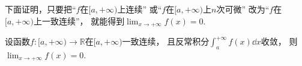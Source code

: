 下面证明，只要把“\(f\)在\([a,+\infty)\)上连续”
或“\(f\)在\([a,+\infty)\)上\(n\)次可微”
改为“\(f\)在\([a,+\infty)\)上一致连续”，
就能得到\(\lim_{x\to+\infty} f(x) = 0\).

\begin{proposition}
设函数\(f\colon[a,+\infty)\to\mathbb{R}\)在\([a,+\infty)\)一致连续，
且反常积分\(\int_a^{+\infty} f(x) \dd{x}\)收敛，
则\(\lim_{x\to+\infty} f(x) = 0\).
\end{proposition}
